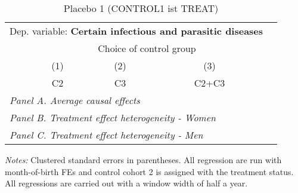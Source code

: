  \begin{table}[H] \centering \begin{threeparttable} \caption{Placebo 1 (CONTROL1 ist TREAT) } {\def\sym#1{\ifmmode^{#1}\else\(^{#1}\)\fi} \begin{tabular}{l*{4}{c}} \toprule \multicolumn{4}{l}{Dep. variable: \textbf{Certain infectious and parasitic diseases}} \\ & \multicolumn{3}{c}{Choice of control group} \\ \cmidrule(lr){2-4}
            &\multicolumn{1}{c}{(1)}&\multicolumn{1}{c}{(2)}&\multicolumn{1}{c}{(3)}\\
            &\multicolumn{1}{c}{C2}&\multicolumn{1}{c}{C3}&\multicolumn{1}{c}{C2+C3}\\
\midrule
 \multicolumn{4}{l}{\emph{Panel A. Average causal effects}} \\      \midrule\multicolumn{4}{l}{\emph{Panel B. Treatment effect heterogeneity - Women}} \\      \midrule\multicolumn{4}{l}{\emph{Panel C. Treatment effect heterogeneity - Men}} \\      
\bottomrule \end{tabular} } \begin{tablenotes} \item \scriptsize \emph{Notes:} Clustered standard errors in parentheses. All regression are run with month-of-birth FEs and control cohort 2 is assigned with the treatment status. All regressions are carried out with a window width of half a year. \end{tablenotes} \end{threeparttable} \end{table} 

